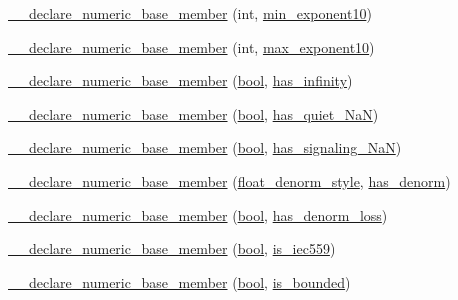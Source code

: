 \begin{DoxyCompactItemize}
\item 
\hyperlink{limits-hack_8h_a204aaef3821dcc3feec0693b1b02dd08}{\+\_\+\+\_\+declare\+\_\+numeric\+\_\+base\+\_\+member} (int, \hyperlink{numinquire_8h_a19a31114f3d5002b21f2f27f64f9cd10}{min\+\_\+exponent10})
\item 
\hyperlink{limits-hack_8h_adcbefbc4f1596116be65f85e09675a28}{\+\_\+\+\_\+declare\+\_\+numeric\+\_\+base\+\_\+member} (int, \hyperlink{numinquire_8h_a901d50aee85856e45aa6c873dfdca1ec}{max\+\_\+exponent10})
\item 
\hyperlink{limits-hack_8h_a37ee94c735036e408230f8ffa025b422}{\+\_\+\+\_\+declare\+\_\+numeric\+\_\+base\+\_\+member} (\hyperlink{compiler_8h_abb452686968e48b67397da5f97445f5b}{bool}, \hyperlink{numinquire_8h_aee9e37bc852a79d447e9b4b5ede2b9f1}{has\+\_\+infinity})
\item 
\hyperlink{limits-hack_8h_a9c57b00fa99736fe0e04af8d18913edd}{\+\_\+\+\_\+declare\+\_\+numeric\+\_\+base\+\_\+member} (\hyperlink{compiler_8h_abb452686968e48b67397da5f97445f5b}{bool}, \hyperlink{numinquire_8h_a4cb0567bdb12a6477256aff5a3af1430}{has\+\_\+quiet\+\_\+\+Na\+N})
\item 
\hyperlink{limits-hack_8h_a54e92a2deb55f76e340d8dfb2093915b}{\+\_\+\+\_\+declare\+\_\+numeric\+\_\+base\+\_\+member} (\hyperlink{compiler_8h_abb452686968e48b67397da5f97445f5b}{bool}, \hyperlink{numinquire_8h_aceee39c084782fed018c4b6ba7ba75ca}{has\+\_\+signaling\+\_\+\+Na\+N})
\item 
\hyperlink{limits-hack_8h_accde29cc70d5e19ae38e0e5947561ac4}{\+\_\+\+\_\+declare\+\_\+numeric\+\_\+base\+\_\+member} (\hyperlink{limits-hack_8h_a592fe78d9bf66455d12aa075f36313b6}{float\+\_\+denorm\+\_\+style}, \hyperlink{numinquire_8h_aeb5ecb4e92ce1ffdf2af4793cb48cf13}{has\+\_\+denorm})
\item 
\hyperlink{limits-hack_8h_a5a20a01343a98030728cdfded0b4f447}{\+\_\+\+\_\+declare\+\_\+numeric\+\_\+base\+\_\+member} (\hyperlink{compiler_8h_abb452686968e48b67397da5f97445f5b}{bool}, \hyperlink{numinquire_8h_a623bde00cdaac6a34529424b0e8f69af}{has\+\_\+denorm\+\_\+loss})
\item 
\hyperlink{limits-hack_8h_a199688d04f55c351e88baf8e18b59036}{\+\_\+\+\_\+declare\+\_\+numeric\+\_\+base\+\_\+member} (\hyperlink{compiler_8h_abb452686968e48b67397da5f97445f5b}{bool}, \hyperlink{numinquire_8h_ac68b7a83df5f772e268dca6b69101d2c}{is\+\_\+iec559})
\item 
\hyperlink{limits-hack_8h_a5adb69fb3da51ca3f6bb29d64a574dc8}{\+\_\+\+\_\+declare\+\_\+numeric\+\_\+base\+\_\+member} (\hyperlink{compiler_8h_abb452686968e48b67397da5f97445f5b}{bool}, \hyperlink{numinquire_8h_a76c822eea59ab5dacbd0bc2d94d94928}{is\+\_\+bounded})

\end{DoxyCompactItemize}
